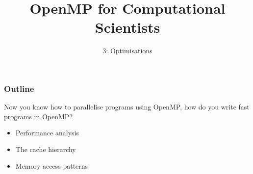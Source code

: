 \documentclass{beamer}
\title{OpenMP for Computational Scientists}
\subtitle{3: Optimisations}
\begin{document}
\frame{\titlepage}

\begin{frame}
\frametitle{Outline}
Now you know how to parallelise programs using OpenMP, how do you write fast programs in OpenMP?
\begin{itemize}
  \item Performance analysis
  \item The cache hierarchy
  \item Memory access patterns
\end{itemize}
\end{frame}

\end{document}

